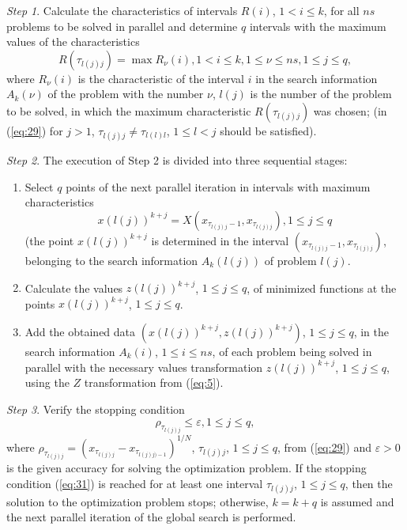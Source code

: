 \documentclass[review]{elsarticle}
\begin{document}
\textit{Step 1}. Calculate the characteristics of intervals $R(i)$, $1 < i \leq k$, for all $ns$ problems to be solved in parallel and determine $q$ intervals with the maximum values of the characteristics
\begin{equation}\label{eq:29}
R(\tau_{l(j)j})=\max{R_\nu(i)}, 1 < i \leq k, 1 \leq \nu \leq ns, 1 \leq j \leq q,
\end{equation}
where $R_\nu(i)$ is the characteristic of the interval $i$ in the search information $A_k(\nu)$ of the problem with the number $\nu$, $l(j)$ is the number of the problem to be solved, in which the maximum characteristic $R(\tau_{l(j)j})$ was chosen; (in (\ref{eq:29}) for $j>1$, $\tau_{l(j)j}\neq \tau_{l(l)l}$, $1 \leq l < j$ should be satisfied).

\textit{Step 2}. The execution of Step 2 is divided into three sequential stages: 
\begin{enumerate}
	 
	\item Select $q$ points of the next parallel iteration in intervals with maximum characteristics
\begin{equation}\label{eq:30}
 x(l(j))^{k+j}=X(x_{\tau_{l(j)j}-1},x_{\tau_{l(j)j}}),1 \leq j \leq q	
\end{equation}
(the point $x(l(j))^{k+j}$ is determined in the interval $(x_{\tau_{l(j)j}-1},x_{\tau_{l(j)j}})$, belonging to the search information $A_k (l(j))$ of problem $l(j)$.

	\item Calculate the values $z(l(j))^{k+j}$, $1 \leq j \leq q$, of minimized functions at the points $x(l(j))^{k+j}$, $1 \leq j \leq q$.
	
  \item Add the obtained data $(x(l(j))^{k+j}, z(l(j))^{k+j})$, $1 \leq j \leq q$, in the search information $A_k(i)$, $1 \leq i \leq ns$, of each problem being solved in parallel with the necessary values transformation $z(l(j))^{k+j}$, $1 \leq j \leq q$, using the $Z$ transformation from (\ref{eq:5}).

\end{enumerate}

\textit{Step 3}. Verify the stopping condition
\begin{equation}\label{eq:31}
\rho_{\tau_{l(j)j}} \leq \varepsilon, 1 \leq j \leq q,
\end{equation}
where $\rho_{\tau_{l(j)j}} = (x_{\tau_{l(j)j}} - x_{\tau_{l(j)j)-1}} )^{1/N}$, $\tau_{l(j)j}$, $1 \leq j \leq q$, from (\ref{eq:29}) and $\varepsilon > 0$ is the given accuracy for solving the optimization problem. If the stopping condition (\ref{eq:31}) is reached for at least one interval $\tau_{l(j)j}$, $1 \leq j \leq q$, then the solution to the optimization problem stops; otherwise, $k=k+q$ is assumed and the next parallel iteration of the global search is performed. 
\end{document}
